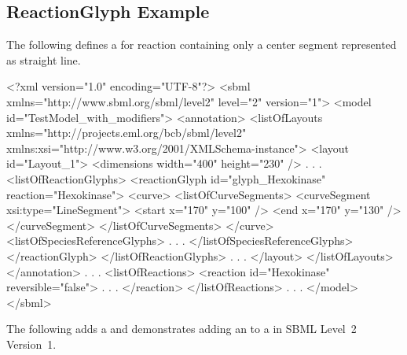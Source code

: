 \subsection{ReactionGlyph Example}
The following defines a \ReactionGlyph for reaction  containing only a center segment represented as straight line. 
\label{example:reactionglyph}
\begin{example}
<?xml version="1.0" encoding="UTF-8"?>
<sbml xmlns="http://www.sbml.org/sbml/level2" level="2" version="1">
  <model id="TestModel_with_modifiers">
    <annotation>
     <listOfLayouts xmlns="http://projects.eml.org/bcb/sbml/level2"
              xmlns:xsi="http://www.w3.org/2001/XMLSchema-instance">
      <layout id="Layout_1">
        <dimensions width="400" height="230" />
              .
              .
              .
        <listOfReactionGlyphs>
          <reactionGlyph id="glyph_Hexokinase" reaction="Hexokinase">
            <curve>
              <listOfCurveSegments>
                <curveSegment xsi:type="LineSegment">
                  <start x="170" y="100" />
                  <end x="170" y="130" />
                </curveSegment>
              </listOfCurveSegments>
            </curve>
            <listOfSpeciesReferenceGlyphs>
                    .
                    .
                    .
            </listOfSpeciesReferenceGlyphs>
          </reactionGlyph>
        </listOfReactionGlyphs>
             .
             .
             .
      </layout>
     </listOfLayouts>
    </annotation>
          .
          .
          .
    <listOfReactions>
      <reaction id="Hexokinase" reversible="false">
                    .
                    .
                    .
      </reaction>
    </listOfReactions>  
        .
        .
        .    
  </model>
</sbml>
\end{example}


The following adds a \SpeciesReferenceGlyph and demonstrates adding an  to a \SpeciesReference in SBML Level~2 Version~1. 


